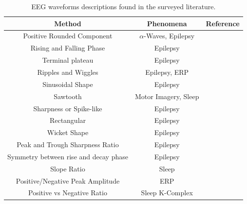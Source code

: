 \documentclass[brainsci,article,submit,moreauthors,pdftex,10pt,a4paper]{mdpi}
\begin{document}


\begin{table}[H]
\caption{EEG waveforms descriptions found in the surveyed literature.}
\centering
\begin{tabular}{ccc}
\toprule
\textbf{Method}	& \textbf{Phenomena} & \textbf{Reference}	\\
\midrule
Positive Rounded Component                    & $\alpha$-Waves, Epilepsy & \citep{Schomer2010,Tatum2008} \\
Rising and Falling Phase      & Epilepsy &  \citep{Thakor2004,Tatum2008} \\
Terminal plateau      & Epilepsy &  \citep{Thakor2004} \\
Ripples and Wiggles     & Epilepsy, ERP &  \citep{EEGIntro, Thakor2004,Cacioppo2007,Kappenman2012} \\
Sinusoidal Shape        & Epilepsy &  \citep{Cacioppo2007,Tatum2008,Ouyang2017,Kappenman2012,Cole2017} \\
Sawtooth                     & Motor Imagery, Sleep &  \citep{EEGIntro,Rodenbeck2006,Tatum2008} \\
Sharpness or Spike-like     & Epilepsy &  \citep{Thakor2004,Hartman2005,Sanei2007,EEGIntro} \\
Rectangular     & Epilepsy &  \citep{Thakor2004,Cole2017} \\
Wicket Shape     & Epilepsy &  \citep{EEGIntro,Hartman2005,Sanei2007,Tatum2008,Schomer2010,Cole2017} \\
Peak and Trough Sharpness Ratio     & Epilepsy &  \citep{Hartman2005,Sanei2007,Lawrence2010,Cole2017} \\
Symmetry between rise and decay phase     & Epilepsy &  \citep{Hartman2005,Cole2017} \\
Slope Ratio    & Sleep &  \citep{Subha2010} \\
Positive/Negative Peak Amplitude & ERP & \citep{Thakor2004,Hartman2005,Tatum2008,Mak2012,MullerPutz2015,Cole2017} \\
Positive vs Negative Ratio    & Sleep K-Complex &  \citep{EEGIntro} \\

\end{tabular}
\end{table}
\end{document}
